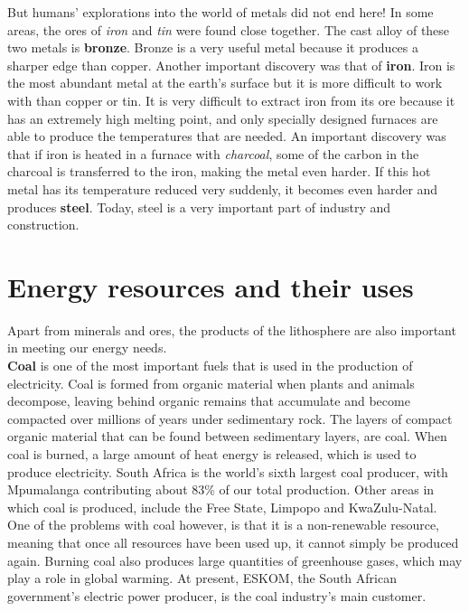 But humans' explorations into the world of metals did not end here! In some areas, the ores of \textit{iron} and \textit{tin} were found close together. The cast alloy of these two metals is \textbf{bronze}. Bronze is a very useful metal because it produces a sharper edge than copper. Another important discovery was that of \textbf{iron}. Iron is the most abundant metal at the earth's surface but it is more difficult to work with than copper or tin. It is very difficult to extract iron from its ore because it has an extremely high melting point, and only specially designed furnaces are able to produce the temperatures that are needed. An important discovery was that if iron is heated in a furnace with \textit{charcoal}, some of the carbon in the charcoal is transferred to the iron, making the metal even harder. If this hot metal has its temperature reduced very suddenly, it becomes even harder and produces \textbf{steel}. Today, steel is a very important part of industry and construction.






\section{Energy resources and their uses}
\label{sec:mining:energy}

Apart from minerals and ores, the products of the lithosphere are also important in meeting our energy needs.\\

\textbf{Coal} is one of the most important fuels that is used in the production of electricity. Coal is formed from organic material when plants and animals decompose, leaving behind organic remains that accumulate and become compacted over millions of years under sedimentary rock. The layers of compact organic material that can be found between sedimentary layers, are coal. When coal is burned, a large amount of heat energy is released, which is used to produce electricity. South Africa is the world's sixth largest coal producer, with Mpumalanga contributing about 83\% of our total production. Other areas in which coal is produced, include the Free State, Limpopo and KwaZulu-Natal. One of the problems with coal however, is that it is a non-renewable resource, meaning that once all resources have been used up, it cannot simply be produced again. Burning coal also produces large quantities of greenhouse gases, which may play a role in global warming. At present, ESKOM, the South African government's electric power producer, is the coal industry's main customer.\\

